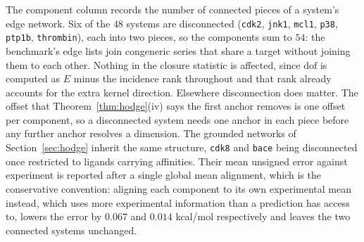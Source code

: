 The component column records the number of connected pieces of a system's edge network. Six of the $48$ systems are disconnected
(\texttt{cdk2}, \texttt{jnk1}, \texttt{mcl1}, \texttt{p38}, \texttt{ptp1b}, \texttt{thrombin}),
each into two pieces, so the components sum to $54$: the benchmark's edge lists join congeneric
series that share a target without joining them to each other. Nothing in the closure statistic is
affected, since $\mathrm{dof}$ is computed as $E$ minus the incidence rank throughout and that
rank already accounts for the extra kernel direction. Elsewhere disconnection does matter. The
offset that Theorem~\ref{thm:hodge}(iv) says the first anchor removes is one offset per component,
so a disconnected system needs one anchor in each piece before any further anchor resolves a
dimension. The grounded networks of Section~\ref{sec:hodge} inherit the same structure, \texttt{cdk8} and
\texttt{bace} being disconnected once restricted to ligands carrying affinities. Their mean
unsigned error against experiment is reported after a single global mean alignment, which is the
conservative convention: aligning each component to its own experimental mean instead, which uses
more experimental information than a prediction has access to, lowers the error by $0.067$ and
$0.014$ kcal/mol respectively and leaves the two connected systems unchanged.



